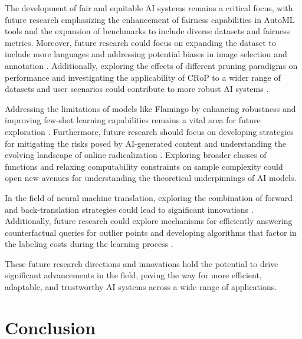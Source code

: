 The development of fair and equitable AI systems remains a critical focus, with future research emphasizing the enhancement of fairness capabilities in AutoML tools and the expansion of benchmarks to include diverse datasets and fairness metrics. Moreover, future research could focus on expanding the dataset to include more languages and addressing potential biases in image selection and annotation \cite{thapliyal2022crossmodal3600massivelymultilingualmultimodal}. Additionally, exploring the effects of different pruning paradigms on performance and investigating the applicability of CRoP to a wider range of datasets and user scenarios could contribute to more robust AI systems \cite{kaur2024cropcontextwiserobuststatic}.



Addressing the limitations of models like Flamingo by enhancing robustness and improving few-shot learning capabilities remains a vital area for future exploration \cite{alayrac2022flamingo}. Furthermore, future research should focus on developing strategies for mitigating the risks posed by AI-generated content and understanding the evolving landscape of online radicalization \cite{mcguffie2020radicalizationrisksgpt3advanced}. Exploring broader classes of functions and relaxing computability constraints on sample complexity could open new avenues for understanding the theoretical underpinnings of AI models.



In the field of neural machine translation, exploring the combination of forward and back-translation strategies could lead to significant innovations \cite{bogoychev2020domaintranslationesenoisesynthetic}. Additionally, future research could explore mechanisms for efficiently answering counterfactual queries for outlier points and developing algorithms that factor in the labeling costs during the learning process \cite{sen2018supervisingfeatureinfluence}.



These future research directions and innovations hold the potential to drive significant advancements in the field, paving the way for more efficient, adaptable, and trustworthy AI systems across a wide range of applications.









\section{Conclusion} \label{sec:Conclusion}







